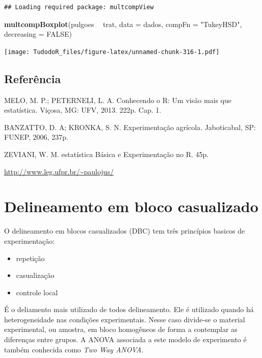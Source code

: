 \documentclass[
]{book}
\newenvironment{Shaded}{\begin{snugshade}}{\end{snugshade}}
\newcommand{\DataTypeTok}[1]{\textcolor[rgb]{0.13,0.29,0.53}{#1}}
\newcommand{\KeywordTok}[1]{\textcolor[rgb]{0.13,0.29,0.53}{\textbf{#1}}}
\newcommand{\NormalTok}[1]{#1}
\newcommand{\OperatorTok}[1]{\textcolor[rgb]{0.81,0.36,0.00}{\textbf{#1}}}
\newcommand{\OtherTok}[1]{\textcolor[rgb]{0.56,0.35,0.01}{#1}}
\newcommand{\StringTok}[1]{\textcolor[rgb]{0.31,0.60,0.02}{#1}}
\begin{document}
\begin{verbatim}
## Loading required package: multcompView
\end{verbatim}

\begin{Shaded}
\begin{Highlighting}[]
\KeywordTok{multcompBoxplot}\NormalTok{(pulgoes }\OperatorTok{~}\StringTok{ }\NormalTok{trat, }\DataTypeTok{data =}\NormalTok{ dados, }\DataTypeTok{compFn =} \StringTok{"TukeyHSD"}\NormalTok{, }\DataTypeTok{decreasing =} \OtherTok{FALSE}\NormalTok{)}
\end{Highlighting}
\end{Shaded}

\texttt{[image: TudodoR\_files/figure-latex/unnamed-chunk-316-1.pdf]}

\hypertarget{referuxeancia-4}{%
\subsection{Referência}\label{referuxeancia-4}}

MELO, M. P.; PETERNELI, L. A. Conhecendo o R: Um visão mais que estatística. Viçosa, MG: UFV, 2013. 222p. Cap. 1.

BANZATTO, D. A; KRONKA, S. N. Experimentação agrícola. Jaboticabal, SP: FUNEP, 2006, 237p.

ZEVIANI, W. M. estatística Básica e Experimentação no R. 45p.

\url{http://www.leg.ufpr.br/~paulojus/}

\hypertarget{delineamento-em-bloco-casualizado}{%
\section{Delineamento em bloco casualizado}\label{delineamento-em-bloco-casualizado}}

O delineamento em blocos casualizados (DBC) tem três princípios basicos de experimentação:

\begin{itemize}
\item
  repetição
\item
  casualização
\item
  controle local
\end{itemize}

É o deliamento mais utilizado de todos delineamento. Ele é utilizado quando há heterogeneidade nas condições experimentais. Nesse caso divide-se o material experimental, ou amostra, em bloco homogêneos de forma a contemplar as diferenças entre grupos. A ANOVA associada a este modelo de experimento é também conhecida como \emph{Two Way ANOVA}.
\end{document}
